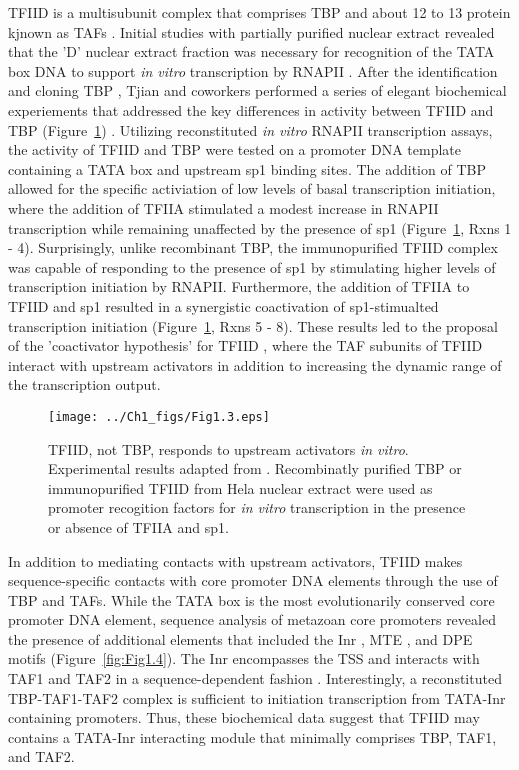 TFIID is a multisubunit complex that comprises TBP and about 12 to 13 protein kjnown as TAFs \cite{Burley_3049}. Initial studies with partially purified nuclear extract revealed that the 'D' nuclear extract fraction was necessary for recognition of the TATA box DNA to support \emph{in vitro} transcription by RNAPII \cite{Matsui_3980}. After the identification and cloning TBP \cite{Buratowski_1988}, Tjian and coworkers performed a series of elegant biochemical experiements that addressed the key differences in activity between TFIID and TBP  (Figure~\ref{fig:Fig1.3})  \cite{Pugh_3586,Dynlacht_3551}. Utilizing reconstituted \emph{in vitro} RNAPII transcription assays, the activity of TFIID and TBP were tested on a promoter DNA template containing a TATA box and upstream sp1 binding sites. The addition of TBP allowed for the specific activiation of low levels of basal transcription initiation, where the addition of TFIIA stimulated a modest increase in RNAPII transcription while remaining unaffected by the presence of sp1 (Figure~\ref{fig:Fig1.3}, Rxns 1 - 4). Surprisingly, unlike recombinant TBP, the immunopurified TFIID complex was capable of responding to the presence of sp1 by stimulating higher levels of transcription initiation by RNAPII.  Furthermore, the addition of TFIIA to TFIID and sp1 resulted in a synergistic coactivation of sp1-stimualted transcription initiation (Figure~\ref{fig:Fig1.3}, Rxns 5 - 8). These results led to the proposal of the 'coactivator hypothesis' for TFIID \cite{Pugh_3586}, where the TAF subunits of TFIID interact with upstream activators in addition to increasing the dynamic range of the transcription output. \\
\begin{figure}
\centering
\texttt{[image: ../Ch1\_figs/Fig1.3.eps]}
\caption[TFIID, not TBP, responds to upstream activitors \emph{in vitro}]{TFIID, not TBP, responds to upstream activators \emph{in vitro}. Experimental results adapted from \cite{Pugh_3586,Dynlacht_3551}. Recombinatly purified TBP or immunopurified TFIID from Hela nuclear extract were used as promoter recogition factors for \emph{in vitro} transcription in the presence or absence of TFIIA and sp1.} 
\label{fig:Fig1.3}
\end{figure}
\indent In addition to mediating contacts with upstream activators, TFIID makes sequence-specific contacts with core promoter DNA elements through the use of TBP and TAFs. While the TATA box is the most evolutionarily conserved core promoter DNA element, sequence analysis of metazoan core promoters revealed the presence of additional elements that included the Inr \cite{Smale_3697}, MTE \cite{Lim_1522}, and DPE \cite{Burke_3081} motifs (Figure~\ref{fig:Fig1.4}). The Inr encompasses the TSS and interacts with TAF1 and TAF2 in a sequence-dependent fashion \cite{Verrijzer_3120,Chalkley_2339}. Interestingly, a reconstituted TBP-TAF1-TAF2 complex is sufficient to initiation transcription from TATA-Inr containing promoters.  Thus, these biochemical data suggest that TFIID may contains a TATA-Inr interacting module that minimally comprises TBP, TAF1, and TAF2. \\
